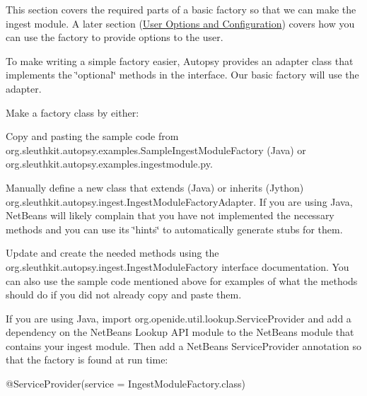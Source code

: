 This section covers the required parts of a basic factory so that we can make the ingest module. A later section (\hyperlink{mod_ingest_page_ingest_modules_making_options}{User Options and Configuration}) covers how you can use the factory to provide options to the user.

To make writing a simple factory easier, Autopsy provides an adapter class that implements the \char`\"{}optional\char`\"{} methods in the interface. Our basic factory will use the adapter.


\begin{DoxyEnumerate}
\item Make a factory class by either\+:
\begin{DoxyItemize}
\item Copy and pasting the sample code from org.\+sleuthkit.\+autopsy.\+examples.\+Sample\+Ingest\+Module\+Factory (Java) or org.\+sleuthkit.\+autopsy.\+examples.\+ingestmodule.\+py.
\item Manually define a new class that extends (Java) or inherits (Jython) org.\+sleuthkit.\+autopsy.\+ingest.\+Ingest\+Module\+Factory\+Adapter. If you are using Java, Net\+Beans will likely complain that you have not implemented the necessary methods and you can use its \char`\"{}hints\char`\"{} to automatically generate stubs for them.
\end{DoxyItemize}
\item Update and create the needed methods using the org.\+sleuthkit.\+autopsy.\+ingest.\+Ingest\+Module\+Factory interface documentation. You can also use the sample code mentioned above for examples of what the methods should do if you did not already copy and paste them.
\item If you are using Java, import org.\+openide.\+util.\+lookup.\+Service\+Provider and add a dependency on the Net\+Beans Lookup A\+PI module to the Net\+Beans module that contains your ingest module. Then add a Net\+Beans Service\+Provider annotation so that the factory is found at run time\+: 
\begin{DoxyCode}
@ServiceProvider(service = IngestModuleFactory.class)
\end{DoxyCode}

\end{DoxyEnumerate}

